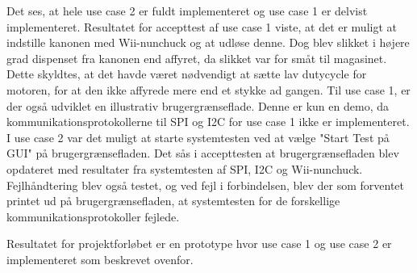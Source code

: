 \noindent Det ses, at hele use case 2 er fuldt implementeret og use case 1 er delvist implementeret. 
Resultatet for accepttest af use case 1 viste, at det er muligt at indstille kanonen med Wii-nunchuck og at udløse denne. Dog blev slikket i højere grad dispenset fra kanonen end affyret, da slikket var for småt til magasinet. Dette skyldtes, at det havde været nødvendigt at sætte lav dutycycle for motoren, for at den ikke affyrede mere end et stykke ad gangen. Til use case 1, er der også udviklet en illustrativ brugergrænseflade. Denne er kun en demo, da kommunikationsprotokollerne til SPI og I2C for use case 1 ikke er implementeret. \\
I use case 2 var det muligt at starte systemtesten ved at vælge "Start Test på GUI" på brugergrænsefladen. Det sås i accepttesten at brugergrænsefladen blev opdateret med resultater fra systemtesten af SPI, I2C og Wii-nunchuck. Fejlhåndtering blev også testet, og ved fejl i forbindelsen, blev der som forventet printet ud på brugergrænsefladen, at systemtesten for de forskellige kommunikationsprotokoller fejlede.




\noindent Resultatet for projektforløbet er en prototype hvor use case 1 og use case 2 er implementeret som beskrevet ovenfor.


